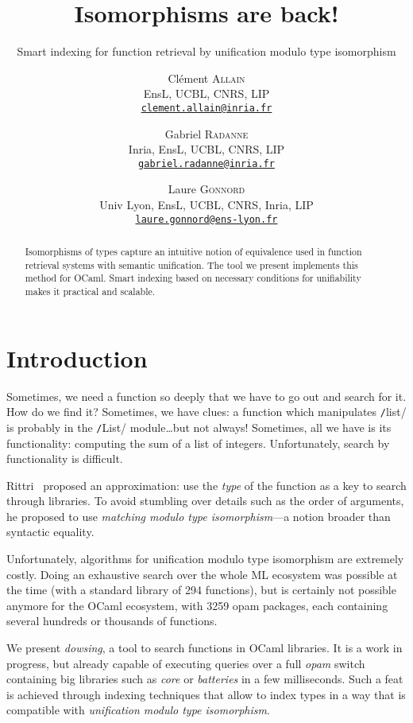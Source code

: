 \documentclass [a4paper,11pt] {scrartcl}
\title {Isomorphisms are back!}
\subtitle {Smart indexing for function retrieval by unification modulo type isomorphism}
\author {
    Clément \textsc {Allain} \\
    EnsL, UCBL, CNRS, LIP \\
    \href {mailto:clement.allain@inria.fr}
    {\nolinkurl {clement.allain@inria.fr}}
  \and
  \and
    Gabriel \textsc {Radanne} \\
    Inria, EnsL, UCBL, CNRS, LIP \\
    \href {mailto:gabriel.radanne@inria.fr}
    {\nolinkurl {gabriel.radanne@inria.fr}}
  \and
    Laure \textsc {Gonnord} \\
    Univ Lyon, EnsL, UCBL, CNRS, Inria, LIP \\
    \href {mailto:laure.gonnord@ens-lyon.fr}
    {\nolinkurl {laure.gonnord@ens-lyon.fr}}
}
\date {}
\newcommand {\dowsing} {\textit {dowsing}}
\begin{document}
\maketitle


\begin {abstract}
  Isomorphisms of types capture an intuitive notion of equivalence used in function retrieval systems with semantic unification. The tool we present implements this method for OCaml. Smart indexing based on necessary conditions for unifiability makes it practical and scalable.
\end {abstract}


\section {Introduction}

Sometimes, we need a function so deeply that we have to go out and search for it.
How do we find it? Sometimes, we have clues: a function which manipulates \texttt/list/ is probably in the \texttt/List/ module\dots but not always!
Sometimes, all we have is its functionality: computing the sum of a list of integers.
Unfortunately, search by functionality is difficult.

Rittri~\cite{rittri} proposed an approximation: use the \emph{type} of the function as a key to search through libraries.
To avoid stumbling over details such as the order of arguments, he proposed to use \emph{matching modulo type isomorphism}---a notion broader than syntactic equality.

Unfortunately, algorithms for unification modulo type isomorphism are extremely costly.
Doing an exhaustive search over the whole ML ecosystem
was possible at the time (with a standard library of 294 functions), but is certainly not possible anymore for the OCaml ecosystem, with 3259 opam packages, each containing several hundreds or thousands of functions.

We present \dowsing, a tool to search functions in OCaml libraries.
It is a work in progress, but already capable of executing queries over a full \textit{opam} switch containing big libraries such as \textit{core} or \textit{batteries} in a few milliseconds.
Such a feat is achieved through indexing techniques that allow to index types in a way that is compatible with \emph{unification modulo type isomorphism}.
\end{document}
